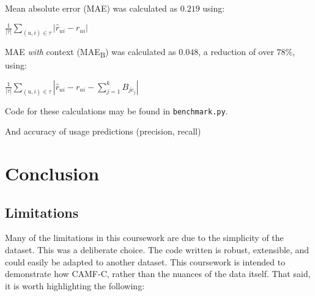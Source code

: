 \documentclass[conference]{IEEEtran}
\begin{document}
Mean absolute error (MAE) was calculated as $0.219$ using:

\begin{center}

$\frac{1}{|\tau|} \sum_{(u, i) \in \tau} |\hat{r}_{ui} - r_{ui}|$

\end{center} 

MAE \textit{with} context (MAE\textsubscript{B}) was calculated as $0.048$, a reduction of over $78\%$, using:

\begin{center}

$\frac{1}{|\tau|} \sum_{(u, i) \in \tau} |\hat{r}_{ui} - r_{ui} - \sum_{j=1}^{k} B_{jc_j}|$

\end{center}

Code for these calculations may be found in \verb|benchmark.py|.

And accuracy of usage predictions (precision, recall)


\section{Conclusion}

\subsection{Limitations}

Many of the limitations in this coursework are due to the simplicity of the dataset. This was a deliberate choice. The code written is robust, extensible, and could easily be adapted to another dataset. This coursework is intended to demonstrate how CAMF-C, rather than the nuances of the data itself. That said, it is worth highlighting the following:
\end{document}
